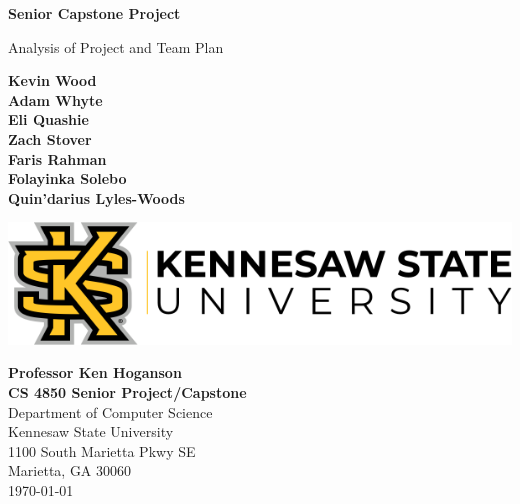 \begin{titlepage}
\begin{center}
	\vspace*{1cm}

	\Huge
	\textbf{Senior Capstone Project}

	\vspace{0.5cm}
	\LARGE
	Analysis of Project and Team Plan

	\vspace{1.5cm}
    \Large

	\textbf{Kevin Wood}\\
	\textbf{Adam Whyte}\\
	\textbf{Eli Quashie}\\
	\textbf{Zach Stover}\\
	\textbf{Faris Rahman}\\
	\textbf{Folayinka Solebo}\\
	\textbf{Quin'darius Lyles-Woods}\\
    

	\vfill
	\LARGE
	\vspace{0.8cm}

	\includegraphics[width=\textwidth]{kennesawlogo}

	\vspace{0.8cm}

	\Large
	\textbf{Professor Ken Hoganson} 			\\
    \textbf{CS 4850 Senior Project/Capstone} \\
	Department of Computer Science   \\
	Kennesaw State University       \\
	1100 South Marietta Pkwy SE     \\
	Marietta, GA 30060              \\
	\today	

	\vspace{1cm}

\end{center}
\end{titlepage}
